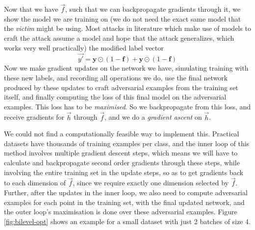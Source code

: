 \documentclass[12pt, oneside]{book}
\begin{document}
Now that we have $\vec{f}$, such that we can backpropagate gradients through it,
we show the model we are training on (we do not need the exact same model that
the \emph{victim} might be using. Most attacks in literature which make use of
models to craft the attack assume a model and hope that the attack generalizes,
which works very well practically) the modified label vector
\begin{equation*}
    \vec{y'} = \textbf{y}\odot(1-\textbf{f})+\textbf{y}\odot(1-\textbf{f})
\end{equation*}
Now we make gradient updates on the network we have, simulating training with
these new labels, and recording all operations we do, use the final network
produced by these updates to craft adversarial examples from the training set
itself, and finally computing the loss of this final model on the adversarial
examples. This loss has to be \emph{maximised}. So we backpropagate from this
loss, and receive gradients for $\vec{h}$ through $\vec{f}$, and we do a
\emph{gradient ascent} on $\vec{h}$.

We could not find a computationally feasible way to implement this. Practical
datasets have thousands of training examples per class, and the inner loop of
this method involves multiple gradient descent steps, which means we will have
to calculate and backpropagate second order gradients through these steps, while
involving the entire training set in the update steps, so as to get gradients
back to each dimension of $\vec{f}$, since we require exactly one dimension
selected by $\vec{f}$. Further, after the updates in the inner loop, we also
need to compute adversarial examples for each point in the training set, with
the final updated network, and the outer loop's maximisation is done over these
adversarial examples. Figure \ref{fig:bilevel-opt} shows an example for a small
dataset with just 2 batches of size 4.
\end{document}
